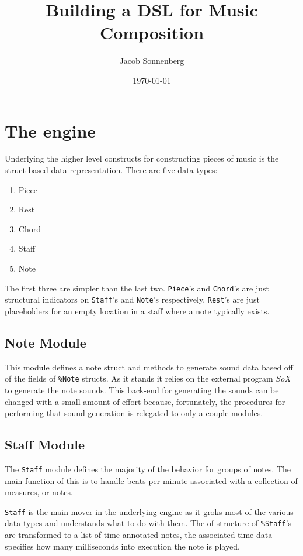 \documentclass[11pt]{article}
\author{Jacob Sonnenberg}
\date{\today}
\title{Building a DSL for Music Composition}
\begin{document}
\maketitle
\tableofcontents

\section{The engine}
\label{sec-1}
Underlying the higher level constructs for constructing pieces of
music is the struct-based data representation. There are five
data-types:
\begin{enumerate}
\item Piece
\item Rest
\item Chord
\item Staff
\item Note
\end{enumerate}
The first three are simpler than the last two. \verb~Piece~'s and
\verb~Chord~'s are just structural indicators on \verb~Staff~'s and \verb~Note~'s
respectively. \verb~Rest~'s are just placeholders for an empty location
in a staff where a note typically exists.

\subsection{Note Module}
\label{sec-1-1}
This module defines a note struct and methods to generate sound
data based off of the fields of \verb~%Note~ structs. As it stands it
relies on the external program \emph{SoX} to generate the note
sounds. This back-end for generating the sounds can be changed with
a small amount of effort because, fortunately, the procedures for
performing that sound generation is relegated to only a couple
modules.

\subsection{Staff Module}
\label{sec-1-2}
The \verb~Staff~ module defines the majority of the behavior for groups
of notes. The main function of this is to handle beats-per-minute
associated with a collection of measures, or notes.

\verb~Staff~ is the main mover in the underlying engine as it groks most
of the various data-types and understands what to do with
them. The of structure of \verb~%Staff~'s are transformed to
a list of time-annotated notes, the associated time data specifies
how many milliseconds into execution the note is played. 
\end{document}
